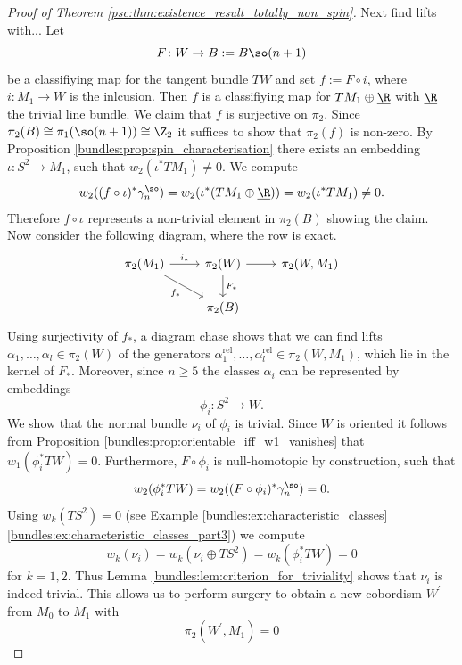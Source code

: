 \begin{proof}[Proof of Theorem \ref{psc:thm:existence_result_totally_non_spin}]
    Next find lifts with...
    Let
    \[
    F \colon W \to B := B\so(n+1)
    \]
    be a classifiying map for the tangent bundle $TW$ and set $f := F \circ i$, where $i \colon M_1 \to W$ is the inlcusion. Then $f$ is a classifiying map for $TM_1 \oplus \underline{\R}$ with $\underline{\R}$ the trivial line bundle. We claim that $f$ is surjective on $\pi_2$. Since $\pi_2(B) \cong \pi_1(\so(n+1)) \cong \Z_2$ it suffices to show that $\pi_2(f)$ is non-zero. By Proposition \ref{bundles:prop:spin_characterisation} there exists an embedding $\iota \colon S^2 \to M_1$, such that $w_2(\iota^\ast TM_1) \neq 0$. We compute 
    \[
    w_2((f \circ \iota)^\ast \gamma_n^\so) = w_2(\iota^\ast (TM_1 \oplus \underline{\R})) = w_2(\iota^\ast TM_1) \neq 0.
    \]
    Therefore $f \circ \iota$ represents a non-trivial element in $\pi_2(B)$ showing the claim. Now consider the following diagram, where the row is exact.
    \[\begin{tikzcd}
	{\pi_2(M_1)} & {\pi_2(W)} & {\pi_2(W,M_1)} \\
	& {\pi_2(B)}
	\arrow["{i_\ast}", from=1-1, to=1-2]
	\arrow["{f_\ast}"', from=1-1, to=2-2]
	\arrow[from=1-2, to=1-3]
	\arrow["{F_\ast}", from=1-2, to=2-2]
    \end{tikzcd}\]
    Using surjectivity of $f_\ast$, a diagram chase shows that we can find lifts $\alpha_1,\ldots, \alpha_l \in \pi_2(W)$ of the generators $\alpha_1^\mathrm{rel},\ldots, \alpha_l^\mathrm{rel} \in \pi_2(W,M_1)$, which lie in the kernel of $F_\ast$. Moreover, since $n \geq 5$ the classes $\alpha_i$ can be represented by embeddings 
    \[
    \phi_i \colon S^2 \to W.
    \]
    We show that the normal bundle $\nu_i$ of $\phi_i$ is trivial. Since $W$ is oriented it follows from Proposition \ref{bundles:prop:orientable_iff_w1_vanishes} that $w_1(\phi_i^\ast TW) = 0$. Furthermore, $F\circ \phi_i$ is null-homotopic by construction, such that 
    \[
    w_2(\phi_i^\ast TW) = w_2 ((F \circ \phi_i)^\ast \gamma_n^\so) = 0.
    \]
    Using $w_k(TS^2) = 0$ (see Example \ref{bundles:ex:characteristic_classes} \ref{bundles:ex:characteristic_classes_part3}) we compute
    \[
    w_k(\nu_i) = w_k(\nu_i \oplus TS^2) = w_k(\phi_i^\ast TW) = 0
    \]
    for $k = 1,2$. Thus Lemma \ref{bundles:lem:criterion_for_triviality} shows that $\nu_i$ is indeed trivial. This allows us to perform surgery to obtain a new cobordism $W^\prime$ from $M_0$ to $M_1$ with 
    \[
    \pi_2(W^\prime,M_1) = 0
    \]

\end{proof}
